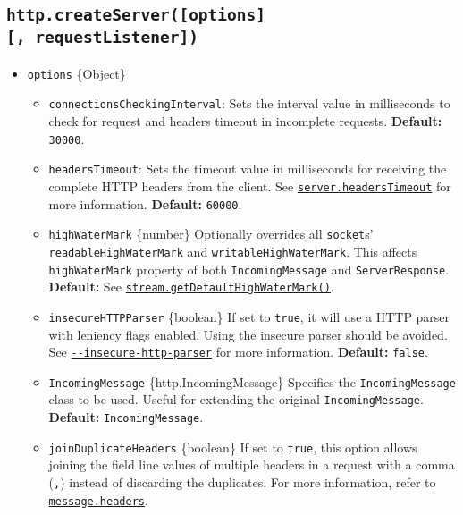 \subsection{\texorpdfstring{\texttt{http.createServer({[}options{]}{[},\ requestListener{]})}}{http.createServer({[}options{]}{[}, requestListener{]})}}\label{http.createserveroptions-requestlistener}

\begin{itemize}
\item
  \texttt{options} \{Object\}

  \begin{itemize}
  \tightlist
  \item
    \texttt{connectionsCheckingInterval}: Sets the interval value in
    milliseconds to check for request and headers timeout in incomplete
    requests. \textbf{Default:} \texttt{30000}.
  \item
    \texttt{headersTimeout}: Sets the timeout value in milliseconds for
    receiving the complete HTTP headers from the client. See
    \hyperref[serverheaderstimeout]{\texttt{server.headersTimeout}} for
    more information. \textbf{Default:} \texttt{60000}.
  \item
    \texttt{highWaterMark} \{number\} Optionally overrides all
    \texttt{socket}s' \texttt{readableHighWaterMark} and
    \texttt{writableHighWaterMark}. This affects \texttt{highWaterMark}
    property of both \texttt{IncomingMessage} and
    \texttt{ServerResponse}. \textbf{Default:} See
    \href{stream.md\#streamgetdefaulthighwatermarkobjectmode}{\texttt{stream.getDefaultHighWaterMark()}}.
  \item
    \texttt{insecureHTTPParser} \{boolean\} If set to \texttt{true}, it
    will use a HTTP parser with leniency flags enabled. Using the
    insecure parser should be avoided. See
    \href{cli.md\#--insecure-http-parser}{\texttt{-\/-insecure-http-parser}}
    for more information. \textbf{Default:} \texttt{false}.
  \item
    \texttt{IncomingMessage} \{http.IncomingMessage\} Specifies the
    \texttt{IncomingMessage} class to be used. Useful for extending the
    original \texttt{IncomingMessage}. \textbf{Default:}
    \texttt{IncomingMessage}.
  \item
    \texttt{joinDuplicateHeaders} \{boolean\} If set to \texttt{true},
    this option allows joining the field line values of multiple headers
    in a request with a comma (\texttt{,}) instead of discarding the
    duplicates. For more information, refer to
    \hyperref[messageheaders]{\texttt{message.headers}}.

\end{itemize}
\end{itemize}
